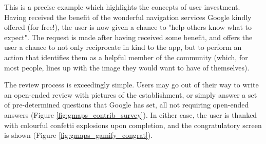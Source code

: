 This is a precise example which highlights the concepts of user investment. Having received the benefit of the wonderful navigation services Google kindly offered (for free!), the user is now given a chance to "help others know what to expect". The request is made after having received some benefit, and offers the user a chance to not only reciprocate in kind to the app, but to perform an action that identifies them as a helpful member of the community (which, for most people, lines up with the image they would want to have of themselves).

The review process is exceedingly simple. Users may go out of their way to write an open-ended review with pictures of the establishment, or simply answer a set of pre-determined questions that Google has set, all not requiring open-ended answers (Figure \ref{fig:gmaps_contrib_survey}). In either case, the user is thanked with colourful confetti explosions upon completion, and the congratulatory screen is shown (Figure \ref{fig:gmaps_gamify_congrat}).

